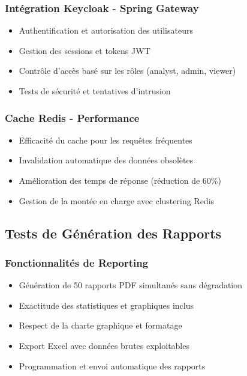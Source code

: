 \subsubsection{Intégration Keycloak - Spring Gateway}
\begin{itemize}
    \item Authentification et autorisation des utilisateurs
    \item Gestion des sessions et tokens JWT
    \item Contrôle d'accès basé sur les rôles (analyst, admin, viewer)
    \item Tests de sécurité et tentatives d'intrusion
\end{itemize}

\subsubsection{Cache Redis - Performance}
\begin{itemize}
    \item Efficacité du cache pour les requêtes fréquentes
    \item Invalidation automatique des données obsolètes
    \item Amélioration des temps de réponse (réduction de 60\%)
    \item Gestion de la montée en charge avec clustering Redis
\end{itemize}

\subsection{Tests de Génération des Rapports}

\subsubsection{Fonctionnalités de Reporting}
\begin{itemize}
    \item Génération de 50 rapports PDF simultanés sans dégradation
    \item Exactitude des statistiques et graphiques inclus
    \item Respect de la charte graphique et formatage
    \item Export Excel avec données brutes exploitables
    \item Programmation et envoi automatique des rapports
\end{itemize}

